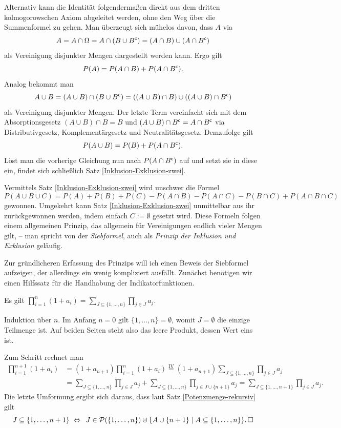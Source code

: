 \noindent
Alternativ kann die Identität folgendermaßen direkt aus dem dritten
kolmogorowschen Axiom abgeleitet werden, ohne den Weg über die Summenformel
zu gehen. Man überzeugt sich mühelos davon, dass $A$ via%
\[A = A\cap\Omega = A\cap(B\cup B^\mathsf c) = (A\cap B)\cup (A\cap B^\mathsf c)\]
als Vereinigung disjunkter Mengen dargestellt werden kann. Ergo gilt%
\[P(A) = P(A\cap B) + P(A\cap B^\mathsf c).\]
Analog bekommt man
\[A\cup B = (A\cup B)\cap (B\cup B^\mathsf c) =
((A\cup B)\cap B)\cup ((A\cup B)\cap B^\mathsf c)\]
als Vereinigung disjunkter Mengen. Der letzte Term vereinfacht sich
mit dem Absorptionsgesetz $(A\cup B)\cap B = B$ und $(A\cup B)\cap B^\mathsf c
= A\cap B^\mathsf c$ via Distributivgesetz, Komplementärgesetz und
Neutralitätsgesetz. Demzufolge gilt%
\[P(A\cup B) = P(B) + P(A\cap B^\mathsf c).\]
Löst man die vorherige Gleichung nun nach $P(A\cap B^\mathsf c)$ auf
und setzt sie in diese ein, findet sich schließlich Satz
\ref{Inklusion-Exklusion-zwei}.

Vermittels Satz \ref{Inklusion-Exklusion-zwei} wird unschwer die Formel
\[P(A\cup B\cup C) = P(A) + P(B) + P(C)
- P(A\cap B) - P(A\cap C) - P(B\cap C) + P(A\cap B\cap C)\]
gewonnen. Umgekehrt kann Satz \ref{Inklusion-Exklusion-zwei} unmittelbar
aus ihr zurückgewonnen werden, indem einfach $C:=\emptyset$ gesetzt
wird. Diese Formeln folgen einem allgemeinen Prinzip, das
allgemein für Vereinigungen endlich vieler Mengen gilt, -- man spricht
von der \emph{Siebformel}, auch als \emph{Prinzip der Inklusion und Exklusion}
geläufig.

Zur gründlicheren Erfassung des Prinzips will ich einen Beweis
der Siebformel aufzeigen, der allerdings ein wenig kompliziert ausfällt.
Zunächst benötigen wir einen Hilfssatz für die Handhabung der
Indikatorfunktionen.

\begin{Satz}\label{prod-1-plus}
Es gilt $\prod_{i=1}^n (1+a_i) = \sum_{J\subseteq\{1,\ldots,n\}}\prod_{j\in J} a_j$.
\end{Satz}
\begin{Beweis}
Induktion über $n$. Im Anfang $n=0$ gilt $\{1,\ldots,n\}=\emptyset$,
womit $J=\emptyset$ die einzige Teilmenge ist. Auf beiden Seiten steht
also das leere Produkt, dessen Wert eins ist.

Zum Schritt rechnet man
\begin{align*}
\prod_{i=1}^{n+1} (1+a_i) &= (1+a_{n+1})\prod_{i=1}^n (1+a_i)
\stackrel{\mathrm{IV}}= (1+a_{n+1})\sum_{J\subseteq\{1,\ldots,n\}}\prod_{j\in J} a_j\\
&= \sum_{J\subseteq\{1,\ldots,n\}}\prod_{j\in J} a_j
+ \sum_{J\subseteq\{1,\ldots,n\}}\prod_{j\in J\cup\{n+1\}} a_j
= \sum_{J\subseteq\{1,\ldots,n+1\}}\prod_{j\in J} a_j.
\end{align*}
Die letzte Umformung ergibt sich daraus, dass laut Satz
\ref{Potenzmenge-rekursiv} gilt
\[J\subseteq\{1,\ldots,n+1\} \;\Leftrightarrow\;\,
J\in\mathcal P(\{1,\ldots,n\})\uplus\{A\cup\{n+1\}\mid A\subseteq\{1,\ldots,n\}\}.\,\Box\]
\end{Beweis}

